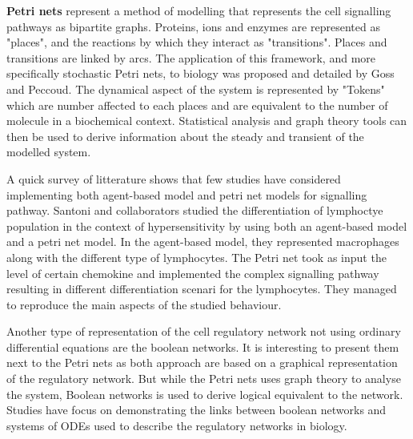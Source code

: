 \documentclass[11pt,a4paper]{article}
\begin{document}
\textbf{Petri nets} represent a method of modelling that represents the cell signalling pathways as bipartite graphs. Proteins, ions and enzymes are represented as "places", and the reactions by which they interact as "transitions". Places and transitions are linked by arcs. The application of this framework, and more specifically stochastic Petri nets, to biology was proposed and detailed by Goss and Peccoud.\cite{Goss1998} The dynamical aspect of the system is represented by "Tokens" which are number affected to each places and are equivalent to the number of molecule in a biochemical context. Statistical analysis and graph theory tools can then be used to derive information about the steady and transient of the modelled system.

A quick survey of litterature shows that few studies have considered implementing both agent-based model and petri net models for signalling pathway. Santoni and collaborators studied the differentiation of lymphoctye population in the context of hypersensitivity by using both an agent-based model and a petri net model.\cite{Santoni2008} In the agent-based model, they represented macrophages along with the different type of lymphocytes. The Petri net took as input the level of certain chemokine and implemented the complex signalling pathway resulting in different differentiation scenari for the lymphocytes. They managed to reproduce the main aspects of the studied behaviour.  %

Another type of representation of the cell regulatory network not using ordinary differential equations are the boolean networks. It is interesting to present them next to the Petri nets as both approach are based on a graphical representation of the regulatory network. But while the Petri nets uses graph theory to analyse the system, Boolean networks is used to derive logical equivalent to the network.\cite{Thomas1995} Studies have focus on demonstrating the links between boolean networks and systems of ODEs used to describe the regulatory networks in biology. \cite{Davidich2008}
\end{document}
